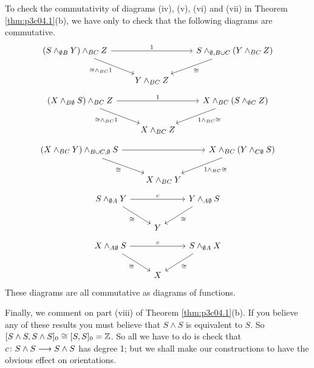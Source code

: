 \documentclass[../main]{subfiles}
\begin{document}
To check the commutativity of diagrams (iv), (v), (vi) and (vii) in
Theorem \ref{thm:p3c04.1}(b), we have only to check that the following diagrams are
commutative.
\[\begin{tikzcd}
    {(S\wedge_{\emptyset B}Y)\wedge_{BC}Z} && {S\wedge_{\emptyset,B\cup C}(Y\wedge_{BC}Z)} \\
    & {Y\wedge_{BC}Z}
    \arrow["\cong", from=1-3, to=2-2]
    \arrow["1", from=1-1, to=1-3]
    \arrow["{\cong\wedge_{BC}1}"', from=1-1, to=2-2]
\end{tikzcd}\]
\[\begin{tikzcd}
    {(X\wedge_{B\emptyset}S)\wedge_{BC}Z} && {X\wedge_{BC}(S\wedge_{\emptyset C}Z)} \\
    & {X\wedge_{BC}Z}
    \arrow["{1\wedge_{BC}\cong}", from=1-3, to=2-2]
    \arrow["1", from=1-1, to=1-3]
    \arrow["{\cong\wedge_{BC}1}"', from=1-1, to=2-2]
\end{tikzcd}\]
\[\begin{tikzcd}
    {(X\wedge_{BC}Y)\wedge_{B\cup C,\emptyset}S} && {X\wedge_{BC}(Y\wedge_{C\emptyset}S)} \\
    & {X\wedge_{BC}Y}
    \arrow["{1\wedge_{BC}\cong}", from=1-3, to=2-2]
    \arrow["\cong"', from=1-1, to=2-2]
    \arrow[from=1-1, to=1-3]
\end{tikzcd}\]
\[\begin{tikzcd}
    {S\wedge_{\emptyset A}Y} && {Y\wedge_{A\emptyset}S} \\
    & Y
    \arrow["\cong", from=1-3, to=2-2]
    \arrow["\cong"', from=1-1, to=2-2]
    \arrow["c", from=1-1, to=1-3]
\end{tikzcd}\]
\[\begin{tikzcd}
    {X\wedge_{A\emptyset}S} && {S\wedge_{\emptyset A}X} \\
    & X
    \arrow["\cong", from=1-3, to=2-2]
    \arrow["\cong"', from=1-1, to=2-2]
    \arrow["c", from=1-1, to=1-3]
\end{tikzcd}\]
These diagrams are all commutative as diagrams of functions. 

Finally, we comment on part (viii) of Theorem \ref{thm:p3c04.1}(b). If you believe any of these results you must believe that $S\wedge S$ is equivalent to $S$. So $[S\wedge S,S\wedge S]_0 \cong [S,S]_0 = \mathbb{Z}$. So all we have to do is check that $c\colon S\wedge S \longrightarrow S\wedge S$ has degree 1; but we shall make our constructions to have the obvious effect on orientations.
\end{document}
